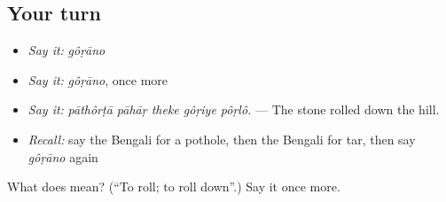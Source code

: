 \subsection*{Your turn}
\begin{itemize}
\raggedright
  \item \emph{Say it:} \emph{gôṛāno}
  \item \emph{Say it:} \emph{gôṛāno}, once more
  \item \emph{Say it:} \emph{pāthôrṭā pāhāṛ theke gôṛiye pôṛlô.} — The stone rolled down the hill.
  \item \emph{Recall:} say the Bengali for a pothole, then the Bengali for tar, then say \emph{gôṛāno} again
\end{itemize}

\begin{tcolorbox}[breakable,colback=teal!4,colframe=teal!35!black,title={Before you move on}]
What does  mean? (\textquotedblleft{}To roll; to roll down\textquotedblright{}.) Say it once more.
\end{tcolorbox}
